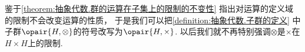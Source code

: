鉴于\cref{theorem:抽象代数.群的运算在子集上的限制的不变性}
指出对运算的定义域的限制不会改变运算的性质，
于是我们可以把\cref{definition:抽象代数.子群的定义} 中%
子群\(\opair{H,\otimes}\)的符号改写为\(\opair{H,\times}\).
以后我们就不再特别强调\(\otimes\)是\(\times\)在\(H\times H\)上的限制.

%
%
%


